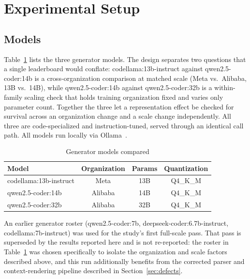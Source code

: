 \documentclass[conference]{IEEEtran}
\begin{document}
\section{Experimental Setup}

\subsection{Models}
\label{sec:models}
Table~\ref{tab:models} lists the three generator models. The design separates two questions
that a single leaderboard would conflate: codellama:13b-instruct against qwen2.5-coder:14b is a
cross-organization comparison at matched scale (Meta vs.\ Alibaba, 13B vs.\ 14B), while
qwen2.5-coder:14b against qwen2.5-coder:32b is a within-family scaling check that holds
training organization fixed and varies only parameter count. Together the three let a
representation effect be checked for survival across an organization change and a scale change
independently. All three are code-specialized and instruction-tuned, served through an identical
call path. All models run locally via Ollama~\cite{ollama}.

\begin{table}[htbp]
\caption{Generator models compared}
\label{tab:models}
\centering
\begin{tabular}{@{}lccc@{}}
\toprule
Model & Organization & Params & Quantization \\
\midrule
codellama:13b-instruct & Meta & 13B & Q4\_K\_M \\
qwen2.5-coder:14b & Alibaba & 14B & Q4\_K\_M \\
qwen2.5-coder:32b & Alibaba & 32B & Q4\_K\_M \\
\bottomrule
\end{tabular}
\end{table}

An earlier generator roster (qwen2.5-coder:7b, deepseek-coder:6.7b-instruct,
codellama:7b-instruct) was used for the study's first full-scale pass. That pass is superseded
by the results reported here and is not re-reported: the roster in Table~\ref{tab:models} was
chosen specifically to isolate the organization and scale factors described above, and this run
additionally benefits from the corrected parser and context-rendering pipeline described in
Section~\ref{sec:defects}.
\end{document}
